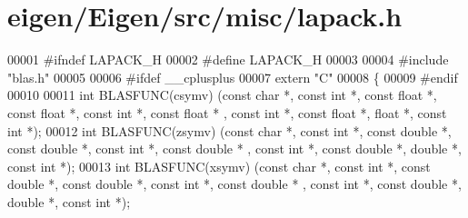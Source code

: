 \hypertarget{eigen_2_eigen_2src_2misc_2lapack_8h_source}{}\section{eigen/\+Eigen/src/misc/lapack.h}
\label{eigen_2_eigen_2src_2misc_2lapack_8h_source}

\begin{DoxyCode}
00001 \textcolor{preprocessor}{#ifndef LAPACK\_H}
00002 \textcolor{preprocessor}{#define LAPACK\_H}
00003 
00004 \textcolor{preprocessor}{#include "blas.h"}
00005 
00006 \textcolor{preprocessor}{#ifdef \_\_cplusplus}
00007 \textcolor{keyword}{extern} \textcolor{stringliteral}{"C"}
00008 \{
00009 \textcolor{preprocessor}{#endif}
00010 
00011 \textcolor{keywordtype}{int} BLASFUNC(csymv) (\textcolor{keyword}{const} \textcolor{keywordtype}{char} *, \textcolor{keyword}{const} \textcolor{keywordtype}{int} *, \textcolor{keyword}{const} \textcolor{keywordtype}{float}  *, \textcolor{keyword}{const} \textcolor{keywordtype}{float}  *, \textcolor{keyword}{const} \textcolor{keywordtype}{int} *, \textcolor{keyword}{const} \textcolor{keywordtype}{float}  *
      , \textcolor{keyword}{const} \textcolor{keywordtype}{int} *, \textcolor{keyword}{const} \textcolor{keywordtype}{float}  *, \textcolor{keywordtype}{float}  *, \textcolor{keyword}{const} \textcolor{keywordtype}{int} *);
00012 \textcolor{keywordtype}{int} BLASFUNC(zsymv) (\textcolor{keyword}{const} \textcolor{keywordtype}{char} *, \textcolor{keyword}{const} \textcolor{keywordtype}{int} *, \textcolor{keyword}{const} \textcolor{keywordtype}{double} *, \textcolor{keyword}{const} \textcolor{keywordtype}{double} *, \textcolor{keyword}{const} \textcolor{keywordtype}{int} *, \textcolor{keyword}{const} \textcolor{keywordtype}{double} *
      , \textcolor{keyword}{const} \textcolor{keywordtype}{int} *, \textcolor{keyword}{const} \textcolor{keywordtype}{double} *, \textcolor{keywordtype}{double} *, \textcolor{keyword}{const} \textcolor{keywordtype}{int} *);
00013 \textcolor{keywordtype}{int} BLASFUNC(xsymv) (\textcolor{keyword}{const} \textcolor{keywordtype}{char} *, \textcolor{keyword}{const} \textcolor{keywordtype}{int} *, \textcolor{keyword}{const} \textcolor{keywordtype}{double} *, \textcolor{keyword}{const} \textcolor{keywordtype}{double} *, \textcolor{keyword}{const} \textcolor{keywordtype}{int} *, \textcolor{keyword}{const} \textcolor{keywordtype}{double} *
      , \textcolor{keyword}{const} \textcolor{keywordtype}{int} *, \textcolor{keyword}{const} \textcolor{keywordtype}{double} *, \textcolor{keywordtype}{double} *, \textcolor{keyword}{const} \textcolor{keywordtype}{int} *);

\end{DoxyCode}
